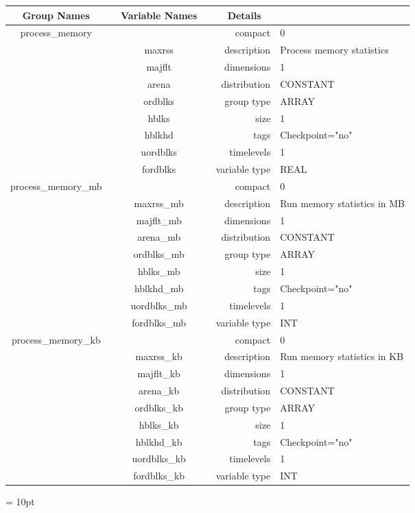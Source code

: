 \documentclass{article}
\begin{document}
\begin{tabular*}{150mm}{|c|c@{\extracolsep{\fill}}|rl|} \hline 
~ {\bf Group Names} ~ & ~ {\bf Variable Names} ~  &{\bf Details} ~ & ~\\ 
\hline 
process\_memory &  & compact & 0 \\ 
 & maxrss & description & Process memory statistics \\ 
 & majflt & dimensions & 1 \\ 
 & arena & distribution & CONSTANT \\ 
 & ordblks & group type & ARRAY \\ 
 & hblks & size & 1 \\ 
 & hblkhd & tags & Checkpoint="no" \\ 
 & uordblks & timelevels & 1 \\ 
 & fordblks & variable type & REAL \\ 
\hline 
process\_memory\_mb &  & compact & 0 \\ 
 & maxrss\_mb & description & Run memory statistics in MB \\ 
 & majflt\_mb & dimensions & 1 \\ 
 & arena\_mb & distribution & CONSTANT \\ 
 & ordblks\_mb & group type & ARRAY \\ 
 & hblks\_mb & size & 1 \\ 
 & hblkhd\_mb & tags & Checkpoint="no" \\ 
 & uordblks\_mb & timelevels & 1 \\ 
 & fordblks\_mb & variable type & INT \\ 
\hline 
process\_memory\_kb &  & compact & 0 \\ 
 & maxrss\_kb & description & Run memory statistics in KB \\ 
 & majflt\_kb & dimensions & 1 \\ 
 & arena\_kb & distribution & CONSTANT \\ 
 & ordblks\_kb & group type & ARRAY \\ 
 & hblks\_kb & size & 1 \\ 
 & hblkhd\_kb & tags & Checkpoint="no" \\ 
 & uordblks\_kb & timelevels & 1 \\ 
 & fordblks\_kb & variable type & INT \\ 
\hline 
\end{tabular*} 



\vspace{5mm}\parskip = 10pt 
\end{document}
